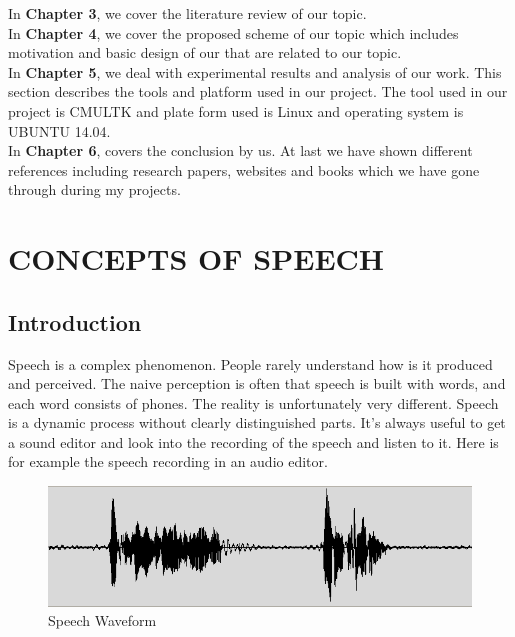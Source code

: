 \documentclass[12pt,a4paper,oneside]{memoir}
\begin{document}
In \textbf{Chapter 3}, we cover the literature review of our topic.\\


In \textbf{Chapter 4}, we cover the proposed scheme of our topic which includes motivation and basic design of our that are related to our topic.\\


In \textbf{Chapter 5}, we deal with experimental results and analysis of our work. This section describes the tools and platform used in our project.
The tool used in our project is CMULTK and plate form used is Linux and operating system is UBUNTU 14.04.\\


In \textbf{Chapter 6}, covers the conclusion by us. At last we have shown different references including research papers, websites and books which we have gone through during my projects. 













\chapter{ CONCEPTS OF SPEECH}

\section{Introduction}
Speech is a complex phenomenon. People rarely understand how is it produced and perceived. The naive perception is often that speech is built with words, and each word consists of phones. The reality is unfortunately very different. Speech is a dynamic process without clearly distinguished parts. It's always useful to get a sound editor and look into the recording of the speech and listen to it. Here is for example the speech recording in an audio editor.

\begin{figure}[h]
    \centering
    \includegraphics[scale=0.5]{waveform}
    \caption{Speech Waveform}
\end{figure}
\end{document}

